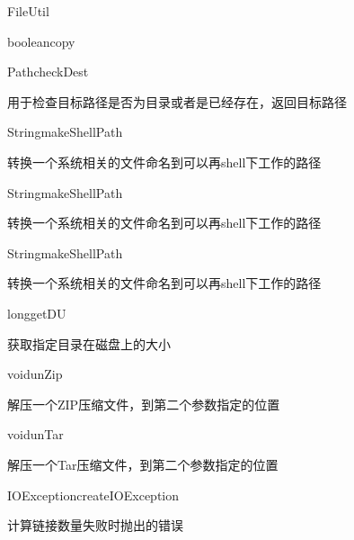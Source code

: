 \begin{XeClass}{FileUtil}
\begin{XeMethod}{\XePrivate}{boolean}{copy}
    \end{XeMethod}

    \begin{XeMethod}{\XePrivate}{Path}{checkDest}
         
 用于检查目标路径是否为目录或者是已经存在，返回目标路径

    \end{XeMethod}

    \begin{XeMethod}{\XePublic}{String}{makeShellPath}
         
 转换一个系统相关的文件命名到可以再shell下工作的路径

    \end{XeMethod}

    \begin{XeMethod}{\XePublic}{String}{makeShellPath}
         
 转换一个系统相关的文件命名到可以再shell下工作的路径

    \end{XeMethod}

    \begin{XeMethod}{\XePublic}{String}{makeShellPath}
         
 转换一个系统相关的文件命名到可以再shell下工作的路径

    \end{XeMethod}

    \begin{XeMethod}{\XePublic}{long}{getDU}
         
 获取指定目录在磁盘上的大小

    \end{XeMethod}

    \begin{XeMethod}{\XePublic}{void}{unZip}
         
 解压一个ZIP压缩文件，到第二个参数指定的位置

    \end{XeMethod}

    \begin{XeMethod}{\XePublic}{void}{unTar}
         
 解压一个Tar压缩文件，到第二个参数指定的位置

    \end{XeMethod}

    \begin{XeMethod}{\XePrivate}{IOException}{createIOException}
         
 计算链接数量失败时抛出的错误


\end{XeMethod}
\end{XeClass}
